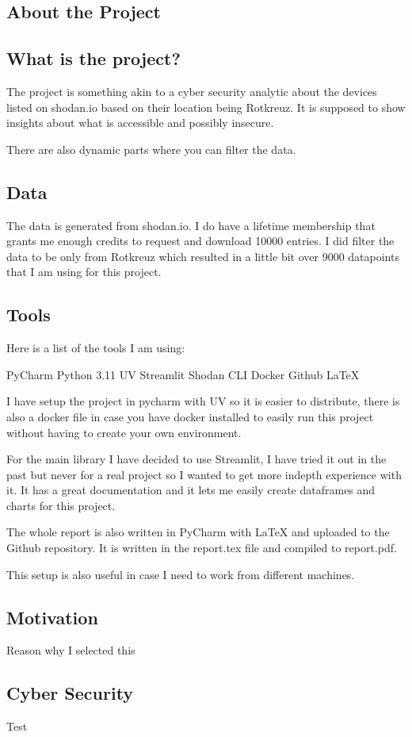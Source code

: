 \documentclass[11pt,a4paper]{article}
\begin{document}
\newpage

\begin{about}
\section{About the Project}
\subsection{What is the project?}
The project is something akin to a cyber security analytic about the devices listed on shodan.io based on their location
being Rotkreuz. It is supposed to show insights about what is accessible and possibly insecure.

There are also dynamic parts where you can filter the data.
\subsection{Data}
The data is generated from shodan.io. I do have a lifetime membership that grants me enough credits to request and
download 10000 entries. I did filter the data to be only from Rotkreuz which resulted in a little bit over 9000
datapoints that I am using for this project.

\subsection{Tools}
Here is a list of the tools I am using:

PyCharm
Python 3.11
UV
Streamlit
Shodan CLI
Docker
Github
LaTeX

I have setup the project in pycharm with UV so it is easier to distribute, there is also a docker file in case you have
docker installed to easily run this project without having to create your own environment.

For the main library I have decided to use Streamlit, I have tried it out in the past but never for a real project so I
wanted to get more indepth experience with it. It has a great documentation and it lets me easily create dataframes and
charts for this project.

The whole report is also written in PyCharm with LaTeX and uploaded to the Github repository. It is written in the
report.tex file and compiled to report.pdf.

This setup is also useful in case I need to work from different machines.

\end{about}
\newpage

\begin{motivation}
\section{Motivation}
Reason why I selected this

\subsection{Cyber Security}
Test

\end{motivation}
\newpage
\end{document}
